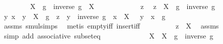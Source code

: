 \begin{isabellebody}
\ \ \isamarkupfalse%
\isanewline
\ \ \ \ \isamarkupfalse%
\ {\isachardoublequoteopen}{\isacharparenleft}{\kern0pt}X\ {\isasymcdots}\ {\isacharbraceleft}{\kern0pt}g{\isacharbraceright}{\kern0pt}{\isacharparenright}{\kern0pt}\ {\isasymcdots}\ {\isacharbraceleft}{\kern0pt}inverse\ g{\isacharbraceright}{\kern0pt}\ {\isasymsubseteq}\ X{\isachardoublequoteclose}\isanewline
\ \ \ \ \isamarkupfalse%
\isanewline
\ \ \ \ \ \ \isamarkupfalse%
\ z\ \isamarkupfalse%
\ {\isachardoublequoteopen}z\ {\isasymin}\ {\isacharparenleft}{\kern0pt}X\ {\isasymcdots}\ {\isacharbraceleft}{\kern0pt}g{\isacharbraceright}{\kern0pt}{\isacharparenright}{\kern0pt}\ {\isasymcdots}\ {\isacharbraceleft}{\kern0pt}inverse\ g{\isacharbraceright}{\kern0pt}{\isachardoublequoteclose}\isanewline
\ \ \ \ \ \ \isamarkupfalse%
\ \isamarkupfalse%
\ y\ x\ \ {\isachardoublequoteopen}y\ {\isasymin}\ X\ {\isasymcdots}\ {\isacharbraceleft}{\kern0pt}g{\isacharbraceright}{\kern0pt}{\isachardoublequoteclose}\ \ {\isachardoublequoteopen}z\ {\isacharequal}{\kern0pt}\ y\ {\isasymcdot}\ inverse\ g{\isachardoublequoteclose}\ \ {\isachardoublequoteopen}x\ {\isasymin}\ X{\isachardoublequoteclose}\ \ \ {\isachardoublequoteopen}y\ {\isacharequal}{\kern0pt}\ x\ {\isasymcdot}\ g{\isachardoublequoteclose}\ \isanewline
\ \ \ \ \ \ \ \ \isamarkupfalse%
\ assms\ smul{\isachardot}{\kern0pt}simps\ \isamarkupfalse%
\ {\isacharparenleft}{\kern0pt}metis\ empty{\isacharunderscore}{\kern0pt}iff\ insert{\isacharunderscore}{\kern0pt}iff{\isacharparenright}{\kern0pt}\isanewline
\ \ \ \ \ \ \isamarkupfalse%
\ \isamarkupfalse%
\ {\isachardoublequoteopen}z\ {\isasymin}\ X{\isachardoublequoteclose}\ \isamarkupfalse%
\ assms\ \isamarkupfalse%
\ {\isacharparenleft}{\kern0pt}simp\ add{\isacharcolon}{\kern0pt}\ associative\ subset{\isacharunderscore}{\kern0pt}eq{\isacharparenright}{\kern0pt}\isanewline
\ \ \ \ \isamarkupfalse%
\isanewline
\ \ \isamarkupfalse%
\isanewline
\ \ \ \ \isamarkupfalse%
\ {\isachardoublequoteopen}X\ {\isasymsubseteq}\ {\isacharparenleft}{\kern0pt}X\ {\isasymcdots}\ {\isacharbraceleft}{\kern0pt}g{\isacharbraceright}{\kern0pt}{\isacharparenright}{\kern0pt}\ {\isasymcdots}\ {\isacharbraceleft}{\kern0pt}inverse\ g{\isacharbraceright}{\kern0pt}{\isachardoublequoteclose}\ \isanewline
\ \ \ \ \isamarkupfalse%

\end{isabellebody}
